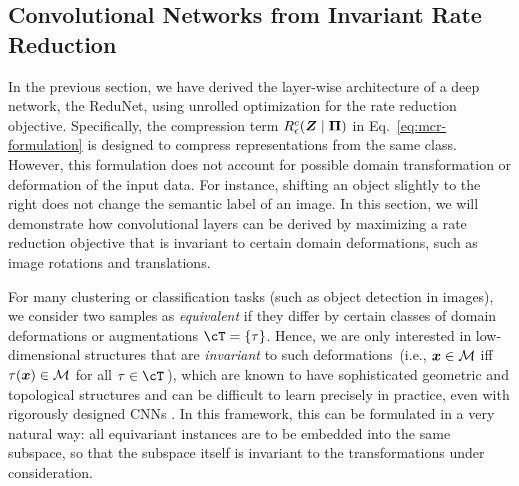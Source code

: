 \documentclass[\toplevelprefix/book-main.tex]{subfiles}
\begin{document}
\subsection{Convolutional Networks from Invariant Rate Reduction}\label{sec:shift-invariant}

In the previous section, we have derived the layer-wise architecture of a deep network, the ReduNet, using unrolled optimization for the rate reduction objective. 
Specifically, the compression term $R^c_\epsilon(\bm{Z} \mid\bm \Pi)$ in Eq.~\eqref{eq:mcr-formulation} is designed to compress representations from the same class. However, this formulation does not account for possible domain transformation or deformation of the input data. For instance, shifting an object slightly to the right does not change the semantic label of an image.  In this section, we will demonstrate how convolutional layers can be derived by maximizing a rate reduction objective that is invariant to certain domain deformations, such as image rotations and translations. 


For many clustering or classification tasks (such as object detection in images), we consider two samples as {\em equivalent} if they differ by certain classes of domain deformations or augmentations $\cT = \{\tau \}$. Hence, we are only interested in low-dimensional structures that are {\em invariant} to such deformations~(i.e., $\bm{x} \in \mathcal{M}$ iff $\tau(\bm{x}) \in \mathcal{M}$ for all $\tau \in \cT$\,), 
which are known to have sophisticated geometric and topological structures and can be difficult to learn precisely in practice, even with rigorously designed CNNs \cite{Cohen-ICML-2016}. 
In this framework, this can be formulated in a very natural way: all equivariant instances are to be embedded into the same subspace, so that the subspace itself is invariant to the transformations under consideration.
\end{document}
